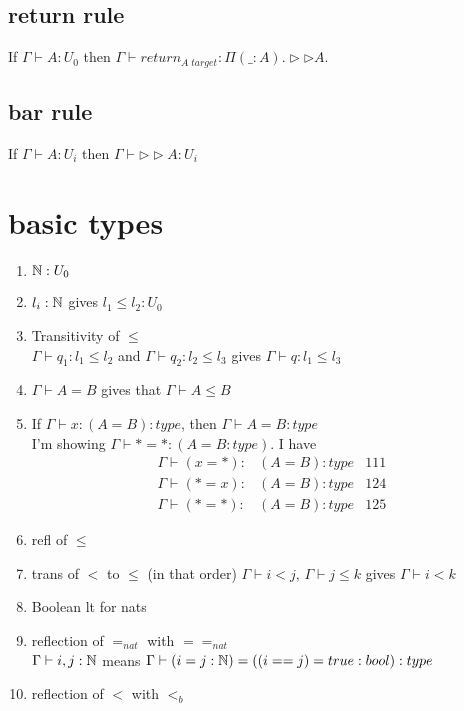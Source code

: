 \documentclass{article}
\begin{document}
\subsection{return rule}
If $\Gamma \vdash A : U_0$ then $\Gamma \vdash return_{A \; target} : \Pi(\_ : A). \rhd \rhd A$.

\subsection{bar rule}
If $\Gamma \vdash A : U_i$ then
$\Gamma \vdash \rhd \rhd A : U_i$

\section*{basic types}
\begin{enumerate}
    \item $\mathbb{N} : U_0$
    \item $l_i : \mathbb{N}$ gives $l_1 \leq l_2 : U_0$
    \item Transitivity of $\leq$\\
    $\Gamma \vdash q_1: l_1 \leq l_2$ and 
    $\Gamma \vdash q_2: l_2 \leq l_3$ gives
     $\Gamma \vdash q: l_1 \leq l_3$
     \item $\Gamma \vdash A = B$ gives that $\Gamma \vdash A \leq B$
     \item If $\Gamma \vdash x: (A = B): type$, then $\Gamma \vdash A = B : type$\\
     I'm showing $\Gamma \vdash * = * : (A = B : type)$. I have
     \begin{align}
         \Gamma \vdash (x = *):& (A = B) : type &\text{111}\\
          \Gamma \vdash (* = x):& (A = B) : type &\text{124}\\
           \Gamma \vdash (* = *):& (A = B) : type &\text{125}
     \end{align}
      \item refl of $\leq$
      \item trans of $<$ to $\leq$ (in that order)
      $\Gamma \vdash  i < j$, $\Gamma \vdash j \leq k$ gives $\Gamma \vdash i < k$
      \item Boolean lt for nats
      \item reflection of $=_{nat}$ with $==_{nat}$\\
      $\Gamma \vdash i, j : \mathbb{N}$ means $\Gamma \vdash (i = j : \mathbb{N}) = ((i == j) = true : bool) : type$
      \item reflection of $<$ with $<_b$\\

\end{enumerate}
\end{document}
